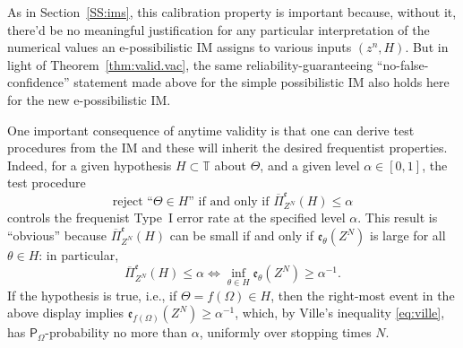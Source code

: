 \documentclass[a4paper, 12pt]{article}
\theoremstyle{plain}
\theoremstyle{definition}
\theoremstyle{remark}
\newcommand{\prob}{\mathsf{P}}
\newcommand{\TT}{\mathbb{T}}
\newcommand{\uPi}{\overline{\Pi}}
\newcommand{\eval}{\mathfrak{e}}
\begin{document}
%

As in Section~\ref{SS:ims}, this calibration property is important because, without it, there'd be no meaningful justification for any particular interpretation of the numerical values an e-possibilistic IM assigns to various inputs $(z^n, H)$.  But in light of Theorem~\ref{thm:valid.vac}, the same reliability-guaranteeing ``no-false-confidence'' statement made above for the simple possibilistic IM also holds here for the new e-possibilistic IM.  

One important consequence of anytime validity is that one can derive test procedures from the IM and these will inherit the desired frequentist properties.  Indeed, for a given hypothesis $H \subset \TT$ about $\Theta$, and a given level $\alpha \in [0,1]$, the test procedure 
\[ \text{reject ``$\Theta \in H$'' if and only if $\uPi_{Z^N}^\eval(H) \leq \alpha$} \]
controls the frequenist Type~I error rate at the specified level $\alpha$.  This result is ``obvious'' because $\uPi_{Z^N}^\eval(H)$ can be small if and only if $\eval_\theta(Z^N)$ is large for all $\theta \in H$: in particular, 
\[ \uPi_{Z^N}^\eval(H) \leq \alpha \iff \inf_{\theta \in H} \eval_\theta(Z^N) \geq \alpha^{-1}. \]
If the hypothesis is true, i.e., if $\Theta = f(\Omega) \in H$, then the right-most event in the above display implies $\eval_{f(\Omega)}(Z^N) \geq \alpha^{-1}$, which, by Ville's inequality \eqref{eq:ville}, has $\prob_\Omega$-probability no more than $\alpha$, uniformly over stopping times $N$.  
\end{document}

